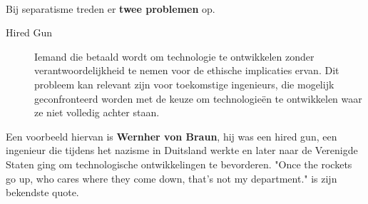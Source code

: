 \documentclass[../summary.tex]{subfiles}
\begin{document}
	\newpage
	\ \\
	Bij separatisme treden er \textbf{twee problemen} op.
	\begin{description}
		\item[Hired Gun] Iemand die betaald wordt om technologie te ontwikkelen zonder verantwoordelijkheid te nemen voor de ethische implicaties ervan. Dit probleem kan relevant  zijn voor toekomstige ingenieurs, die mogelijk geconfronteerd worden met de keuze om technologieën te ontwikkelen waar ze niet volledig achter staan.
	\end{description}
	Een voorbeeld hiervan is \textbf{Wernher von Braun}, hij was een hired gun, een ingenieur die tijdens het nazisme in Duitsland werkte en later naar de Verenigde Staten ging om technologische ontwikkelingen te bevorderen. "Once the rockets go up, who cares where they come down, that's not my department." is zijn bekendste quote.
	
\end{document}
